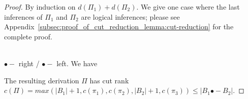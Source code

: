 \documentclass{lmcs}
\makeatletter
\newcommand{\colimp}[0]{\multimapdotinv}
\def\ScoreOverhang{4pt}			%
\def\ScoreOverhangLeft{\ScoreOverhang}
\def\ScoreOverhangRight{\ScoreOverhang}
\def\extraVskip{2pt}			%
\def\ruleScoreFiller{\hrule}		%
\def\defaultScoreFiller{\ruleScoreFiller}  %
\def\defaultBuildScore{\buildSingleScore}  %
\def\defaultHypSeparation{\hskip.2in}   %
\def\labelSpacing{3pt}		%
\def\theHypSeparation{\defaultHypSeparation}
\def\alwaysScoreFiller{\defaultScoreFiller}	%
\def\alwaysBuildScore{\defaultBuildScore}
\def\theScoreFiller{\alwaysScoreFiller}	%
\def\buildScore{\alwaysBuildScore}   %
\def\hypKernAmt{0pt}	%
\def\defaultLeftLabel{}
\def\defaultRightLabel{}
\def\myTrue{Y}
\def\bottomAlignFlag{N}
\def\centerAlignFlag{N}
\def\newdimen{\alloc@1\dimen\dimendef\insc@unt}
\def\newbox{\alloc@4\box\chardef\insc@unt}
\def\thecur#1{\csname#1\number\theLevel\endcsname}
\def\allocatemore{%
	\ifnum\theLevel>\myMaxLevel%
		\expandafter\newbox\curBox%
		\expandafter\newdimen\curScoreStart%
		\expandafter\newdimen\curCenter%
		\expandafter\newdimen\curScoreEnd%
		\global\advance\myMaxLevel by1%
	\fi%
}
\def\prepAxiom{%
	\advance\theLevel by1%
	\edef\curBox{\thecur{myBox}}%
	\edef\curScoreStart{\thecur{myScoreStart}}%
	\edef\curCenter{\thecur{myCenter}}%
	\edef\curScoreEnd{\thecur{myScoreEnd}}%
	\allocatemore%
}
\def\AxiomC#1{		%
	\prepAxiom%
	\setbox\myBoxA=\hbox{#1}%
	\global\setbox\curBox =%
		\hbox{\hskip\ScoreOverhangLeft\relax%
                        \unhcopy\myBoxA\hskip\ScoreOverhangRight\relax}%
        \global\curScoreStart=0pt \relax
        \global\curScoreEnd=\wd\curBox \relax
        \global\curCenter=.5\wd\curBox \relax
        \global\advance \curCenter by \ScoreOverhangLeft%
	\ignorespaces
}
\def\prepUnary{%
	\ifnum \theLevel<1 
		\errmessage{Hypotheses missing!}
	\fi%
	\edef\curBox{\thecur{myBox}}%
	\edef\curScoreStart{\thecur{myScoreStart}}%
	\edef\curCenter{\thecur{myCenter}}%
	\edef\curScoreEnd{\thecur{myScoreEnd}}%
}
\def\UnaryInfC#1{
	\prepUnary%
	\buildConclusionC{#1}%
	\joinUnary%
	\resetInferenceDefaults%
	\ignorespaces%
}
\def\prepBinary{%
	\ifnum\theLevel<2 
		\errmessage{Hypotheses missing!}
	\fi%
	\edef\rcurBox{\thecur{myBox}}%
	\edef\rcurScoreStart{\thecur{myScoreStart}}%
	\edef\rcurCenter{\thecur{myCenter}}%
	\edef\rcurScoreEnd{\thecur{myScoreEnd}}%
	\advance\theLevel by-1
	\edef\lcurBox{\thecur{myBox}}%
	\edef\lcurScoreStart{\thecur{myScoreStart}}%
	\edef\lcurCenter{\thecur{myCenter}}%
	\edef\lcurScoreEnd{\thecur{myScoreEnd}}%
}
\def\BinaryInfC#1{%
	\prepBinary%
	\buildConclusionC{#1}%
	\joinBinary%
	\resetInferenceDefaults%
	\ignorespaces%
}
\def\buildConclusionC#1{%
	\setbox\myBoxA=\hbox{#1}%
	\setbox\myBoxC =%
		\hbox{\hbox{\hskip\ScoreOverhangLeft\relax%
                        \unhcopy\myBoxA\hskip\ScoreOverhangRight\relax}}%
	\newScoreStart=0pt \relax%
	\newCenter=.5\wd\myBoxC \relax%
	\newScoreEnd=\wd\myBoxC%
        \advance \newCenter by \ScoreOverhangLeft%
}
\def\joinUnary{%
	\global\advance\curCenter by -\hypKernAmt%
	\ifnum\curCenter<\newCenter%
		\displace=\newCenter%
		\advance \displace by -\curCenter%
		\kernUpperBox%
	\else%
		\displace=\curCenter%
		\advance \displace by -\newCenter%
		\kernLowerBox%
	\fi%
        \ifnum \newScoreStart < \curScoreStart %
		\global \curScoreStart = \newScoreStart \fi%
	\ifnum \curScoreEnd < \newScoreEnd %
		\global \curScoreEnd = \newScoreEnd \fi%
	\ifnum \curScoreStart<\wd\myBoxLL%
		\global\displace = \wd\myBoxLL%
		\global\advance\displace by -\curScoreStart%
		\kernUpperBox%
		\kernLowerBox%
	\fi%
	\buildScore%
	\buildScoreLabels%
	\global \setbox \curBox =%
		\vbox{\box\curBox%
			\vskip\thisAboveSkip \relax%
			\nointerlineskip\box\myBoxD%
			\vskip\thisBelowSkip \relax%
			\nointerlineskip\box\myBoxC}%
	\global \curScoreStart=\newScoreStart%
	\global \curScoreEnd=\newScoreEnd%
	\global \curCenter=\newCenter%
}
\def\kernUpperBox{%
		\global\setbox\curBox =%
			\hbox{\hskip\displace\box\curBox}%
		\global\advance \curScoreStart by \displace%
		\global\advance \curScoreEnd by \displace%
		\global\advance\curCenter by \displace%
}
\def\kernLowerBox{%
		\global\setbox\myBoxC =%
			\hbox{\hskip\displace\unhbox\myBoxC}%
		\global\advance \newScoreStart by \displace%
		\global\advance \newScoreEnd by \displace%
		\global\advance\newCenter by \displace%
}
\def\joinBinary{%
	\setbox\myBoxA=\hbox{\theHypSeparation}
	\lcurScoreEnd=\rcurScoreEnd%
	\advance\lcurScoreEnd by\wd\lcurBox%
	\advance\lcurScoreEnd by\wd\myBoxA%
	\displace=\lcurScoreEnd%
	\advance\displace by -\lcurScoreStart%
	\lcurCenter=.5\displace%
	\advance\lcurCenter by\lcurScoreStart%
	\setbox\lcurBox=%
		\hbox{\box\lcurBox\unhcopy\myBoxA\box\rcurBox}%
	\displace=\newCenter%
	\advance\displace by -.5\newScoreStart%
	\advance\displace by -.5\newScoreEnd%
	\advance\lcurCenter by \displace%
	\edef\curBox{\lcurBox}%
	\edef\curScoreStart{\lcurScoreStart}%
	\edef\curScoreEnd{\lcurScoreEnd}%
	\edef\curCenter{\lcurCenter}%
	\joinUnary%
}
\def\DisplayProof{%
	\ifnum \theLevel=1 \relax \else%
		\errmessage{Proof tree badly specified.}%
	\fi%
	\edef\curBox{\thecur{myBox}}%
	\ifx\bottomAlignFlag\myTrue%
		\displace=0pt%
	\else%
		\displace=.5\ht\curBox%
		\ifx\centerAlignFlag\myTrue\relax
		\else%
		      	\advance\displace by -3pt%
		\fi%
	\fi%
	\leavevmode%
	\lower\displace\hbox{\copy\curBox}%
	\global\theLevel=0%
	\global\def\alwaysBuildScore{\defaultBuildScore}%
	\global\def\alwaysScoreFiller{\defaultScoreFiller}%
	\def\bottomAlignFlag{N}
	\def\centerAlignFlag{N}
	\resetInferenceDefaults%
	\ignorespaces
}
\def\buildSingleScore{%
	\displace=\curScoreEnd%
	\advance \displace by -\curScoreStart%
	\global\setbox \myBoxD =%
		\hbox to \displace{\expandafter\xleaders\theScoreFiller\hfill}%
}
\def\buildNoScore{%
	\global\setbox\myBoxD=\hbox{\vbox{\vskip1pt}}%
}
\def\singleLine{%
	\gdef\buildScore{\buildSingleScore}%
	\ignorespaces
}
\def\noLine{%
	\gdef\buildScore{\buildNoScore}%
	\ignorespaces
}
\def\insertBetweenHyps#1{%
	\gdef\theHypSeparation{#1}%
	\ignorespaces
}
\def\LeftLabel#1{%
	\global\setbox\myBoxLL=\hbox{{#1}\hskip\labelSpacing}%
	\ignorespaces
}
\def\RightLabel#1{%
	\global\setbox\myBoxRL=\hbox{\hskip\labelSpacing #1}%
	\ignorespaces
}
\def\buildScoreLabels{%
	\scoreHeight = \ht\myBoxD%
	\scoreDepth = \dp\myBoxD%
	\leftLowerAmt=\ht\myBoxLL%
	\advance \leftLowerAmt by -\dp\myBoxLL%
	\advance \leftLowerAmt by -\scoreHeight%
	\advance \leftLowerAmt by \scoreDepth%
	\leftLowerAmt=.5\leftLowerAmt%
	\rightLowerAmt=\ht\myBoxRL%
	\advance \rightLowerAmt by -\dp\myBoxRL%
	\advance \rightLowerAmt by -\scoreHeight%
	\advance \rightLowerAmt by \scoreDepth%
	\rightLowerAmt=.5\rightLowerAmt%
	\displace = \curScoreStart%
	\advance\displace by -\wd\myBoxLL%
	\global\setbox\myBoxD =%
		\hbox{\hskip\displace%
			\lower\leftLowerAmt\copy\myBoxLL%
			\box\myBoxD%
			\lower\rightLowerAmt\copy\myBoxRL}%
	\global\thisAboveSkip = \ht\myBoxLL%
	\global\advance \thisAboveSkip by -\leftLowerAmt%
	\global\advance \thisAboveSkip by -\scoreHeight%
	\ifnum \thisAboveSkip<0 %
		\global\thisAboveSkip=0pt%
	\fi%
	\displace = \ht\myBoxRL%
	\advance \displace by -\rightLowerAmt%
	\advance \displace by -\scoreHeight%
	\ifnum \displace<0 %
		\displace=0pt%
	\fi%
	\ifnum \displace>\thisAboveSkip %
		\global\thisAboveSkip=\displace%
	\fi%
	\global\thisBelowSkip = \dp\myBoxLL%
	\global\advance\thisBelowSkip by \leftLowerAmt%
	\global\advance\thisBelowSkip by -\scoreDepth%
	\ifnum\thisBelowSkip<0 %
		\global\thisBelowSkip = 0pt%
	\fi%
	\displace = \dp\myBoxLL%
	\advance\displace by \rightLowerAmt%
	\advance\displace by -\scoreDepth%
	\ifnum\displace<0 %
		\displace = 0pt%
	\fi%
	\ifnum\displace>\thisBelowSkip%
		\global\thisBelowSkip = \displace%
	\fi
	\global\thisAboveSkip = -\thisAboveSkip%
	\global\thisBelowSkip = -\thisBelowSkip%
	\global\advance\thisAboveSkip by\extraVskip%
	\global\advance\thisBelowSkip by\extraVskip%
}
\def\resetInferenceDefaults{%
	\global\def\theHypSeparation{\defaultHypSeparation}%
	\global\setbox\myBoxLL=\hbox{\defaultLeftLabel}%
	\global\setbox\myBoxRL=\hbox{\defaultRightLabel}%
	\global\def\buildScore{\alwaysBuildScore}%
	\global\def\theScoreFiller{\alwaysScoreFiller}%
	\gdef\hypKernAmt{0pt}%
}
\def\lsub{\mathrel{\bullet\!-}}
\newcommand{\DualLNLLogicdrulename}[1]{\textsc{#1}}
\newcommand{\DualLNLLogicdruleLXXcutName}[0]{\DualLNLLogicdrulename{L\_cut}}
\newcommand{\DualLNLLogicdruleLXXsLName}[0]{\DualLNLLogicdrulename{L\_sL}}
\newcommand{\DualLNLLogicdruleLXXsRName}[0]{\DualLNLLogicdrulename{L\_sR}}
\renewcommand{\DualLNLLogicdrulename}[1]{#1}
\renewcommand{\DualLNLLogicdruleLXXcutName}{\text{LL\_cut}}
\renewcommand{\DualLNLLogicdruleLXXsLName}{\text{LL\_}\hspace{-3px}\colimp_L}
\renewcommand{\DualLNLLogicdruleLXXsRName}{\text{LL\_}\hspace{-3px}\colimp_R}
\makeatother
\begin{document}
\begin{proof}
  By induction on $d(\Pi_1) + d(\Pi_2)$.  We give one case where the
  last inferences of $\Pi_1$ and $\Pi_2$ are logical inferences;
  please see
  Appendix~\ref{subsec:proof_of_cut_reduction_lemma:cut-reduction} for
  the complete proof.

\ \\
\noindent
$\lsub$ right / $\lsub$ left. We have 
\begin{center}
\end{center}
The resulting derivation $\Pi$ has cut rank $c(\Pi) = max(|B_1|+1, c(\pi_1), c(\pi_2), |B_2|+1, c(\pi_3)) \leq |B_1\lsub B_2|$.  
\end{proof}
\end{document}
